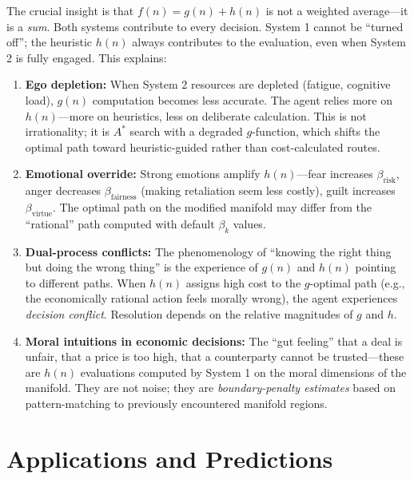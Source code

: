 \documentclass[12pt]{article}
\theoremstyle{definition}
\theoremstyle{remark}
\begin{document}
The crucial insight is that $f(n) = g(n) + h(n)$ is not a weighted average---it is a \emph{sum}.  Both systems contribute to every decision.  System 1 cannot be ``turned off''; the heuristic $h(n)$ always contributes to the evaluation, even when System 2 is fully engaged.  This explains:

\begin{enumerate}
    \item \textbf{Ego depletion:} When System 2 resources are depleted (fatigue, cognitive load), $g(n)$ computation becomes less accurate.  The agent relies more on $h(n)$---more on heuristics, less on deliberate calculation.  This is not irrationality; it is $A^*$ search with a degraded $g$-function, which shifts the optimal path toward heuristic-guided rather than cost-calculated routes.

    \item \textbf{Emotional override:} Strong emotions amplify $h(n)$---fear increases $\beta_{\text{risk}}$, anger decreases $\beta_{\text{fairness}}$ (making retaliation seem less costly), guilt increases $\beta_{\text{virtue}}$.  The optimal path on the modified manifold may differ from the ``rational'' path computed with default $\beta_k$ values.

    \item \textbf{Dual-process conflicts:} The phenomenology of ``knowing the right thing but doing the wrong thing'' is the experience of $g(n)$ and $h(n)$ pointing to different paths.  When $h(n)$ assigns high cost to the $g$-optimal path (e.g., the economically rational action feels morally wrong), the agent experiences \emph{decision conflict}.  Resolution depends on the relative magnitudes of $g$ and $h$.

    \item \textbf{Moral intuitions in economic decisions:} The ``gut feeling'' that a deal is unfair, that a price is too high, that a counterparty cannot be trusted---these are $h(n)$ evaluations computed by System 1 on the moral dimensions of the manifold.  They are not noise; they are \emph{boundary-penalty estimates} based on pattern-matching to previously encountered manifold regions.
\end{enumerate}


\section{Applications and Predictions}
\label{sec:applications}
\end{document}
